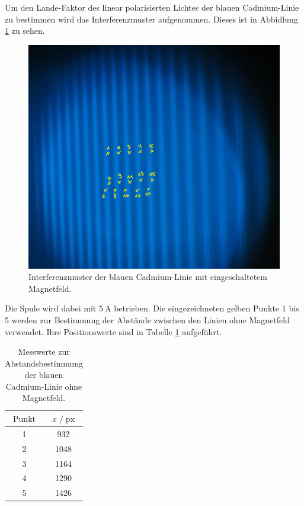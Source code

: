 Um den Lande-Faktor des linear polarisierten Lichtes der blauen Cadmium-Linie zu bestimmen wird das Interferenzmuster aufgenommen. Dieses
ist in Abbidlung \ref{fig:blaupi} zu sehen. 

\begin{figure}
    \centering
    \includegraphics[scale=0.35]{content/blau_pi.png}
    \vspace{-10pt}
    \caption{Interferenzmuster der blauen Cadmium-Linie mit eingeschaltetem Magnetfeld.}
    \label{fig:blaupi}
\end{figure}

Die Spule wird dabei mit $\SI{5}{\ampere}$ betrieben. Die eingezeichneten gelben Punkte 1 bis 5 werden zur Bestimmung der Abstände
zwischen den Linien ohne Magnetfeld verwendet. Ihre Positionswerte sind in Tabelle \ref{tab:mess6} aufgeführt. 

\begin{table}[H]
    \centering
    \caption{Messwerte zur Abstandsbestimmung der blauen Cadmium-Linie ohne Magnetfeld.}
    \label{tab:mess6}
    \begin{tabular}{c c}
    \toprule
    $\text{Punkt}$ & $x \;/\; \text{px}$ \\
    \midrule
        1 & 932\\
        2 & 1048\\
        3 & 1164\\
        4 & 1290\\
        5 & 1426\\
    \bottomrule
    \end{tabular}
\end{table}

